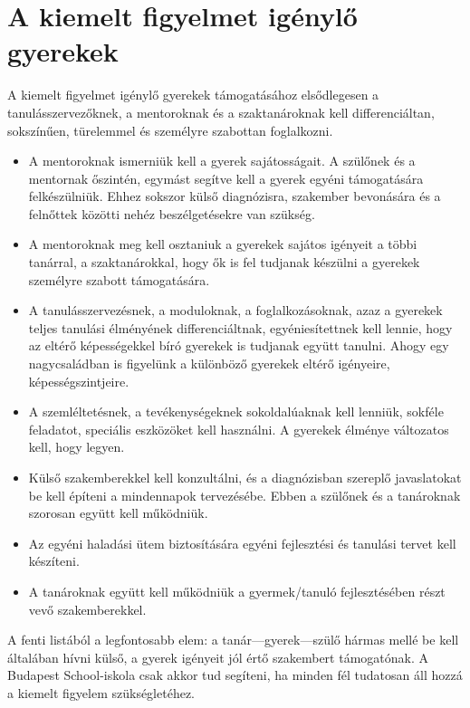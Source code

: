 \hypertarget{a-kiemelt-figyelmet-igenylo-gyerekek}{%
\section{A kiemelt figyelmet igénylő
gyerekek}\label{a-kiemelt-figyelmet-igenylo-gyerekek}}

A kiemelt figyelmet igénylő gyerekek támogatásához elsődlegesen a
tanulásszervezőknek, a mentoroknak és a szaktanároknak kell
differenciáltan, sokszínűen, türelemmel és személyre szabottan
foglalkozni.

\begin{itemize}
\tightlist
\item
  A mentoroknak ismerniük kell a gyerek sajátosságait. A szülőnek és a
  mentornak őszintén, egymást segítve kell a gyerek egyéni támogatására
  felkészülniük. Ehhez sokszor külső diagnózisra, szakember bevonására és
  a felnőttek közötti nehéz beszélgetésekre van szükség.
\item
  A mentoroknak meg kell osztaniuk a gyerekek sajátos igényeit a többi
  tanárral, a szaktanárokkal, hogy ők is fel tudjanak készülni a
  gyerekek személyre szabott támogatására.
\item
  A tanulásszervezésnek, a moduloknak, a foglalkozásoknak, azaz a
  gyerekek teljes tanulási élményének differenciáltnak, egyéniesítettnek
  kell lennie, hogy az eltérő képességekkel bíró gyerekek is tudjanak
  együtt tanulni. Ahogy egy nagycsaládban is figyelünk a különböző
  gyerekek eltérő igényeire, képességszintjeire.
\item
  A szemléltetésnek, a tevékenységeknek sokoldalúaknak kell lenniük,
  sokféle feladatot, speciális eszközöket kell használni. A gyerekek
  élménye változatos kell, hogy legyen.
\item
  Külső szakemberekkel kell konzultálni, és a diagnózisban szereplő
  javaslatokat be kell építeni a mindennapok tervezésébe. Ebben a
  szülőnek és a tanároknak szorosan együtt kell működniük.
\item
  Az egyéni haladási ütem biztosítására egyéni fejlesztési és tanulási
  tervet kell készíteni.
\item
  A tanároknak együtt kell működniük a gyermek/tanuló fejlesztésében
  részt vevő szakemberekkel.
\end{itemize}

A fenti listából a legfontosabb elem: a tanár---gyerek---szülő hármas
mellé be kell általában hívni külső, a gyerek igényeit jól értő
szakembert támogatónak. A Budapest School-iskola csak akkor tud
segíteni, ha minden fél tudatosan áll hozzá a kiemelt figyelem
szükségletéhez.
